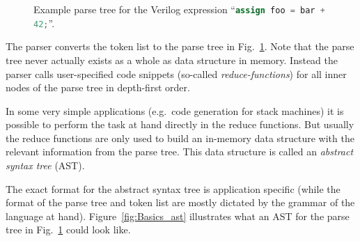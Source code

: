 \begin{figure}[b!]
	\hfil
	\caption{Example parse tree for the Verilog expression ``\lstinline[language=Verilog]{assign foo = bar + 42;}''.}
	\label{fig:Basics_parsetree}
\end{figure}

The parser converts the token list to the parse tree in Fig.~\ref{fig:Basics_parsetree}. Note that the parse
tree never actually exists as a whole as data structure in memory. Instead the parser calls user-specified
code snippets (so-called {\it reduce-functions}) for all inner nodes of the parse tree in depth-first order.

In some very simple applications (e.g.~code generation for stack machines) it is possible to perform the
task at hand directly in the reduce functions. But usually the reduce functions are only used to build an in-memory
data structure with the relevant information from the parse tree. This data structure is called an {\it abstract
syntax tree} (AST).

The exact format for the abstract syntax tree is application specific (while the format of the parse tree and token
list are mostly dictated by the grammar of the language at hand). Figure~\ref{fig:Basics_ast} illustrates what an
AST for the parse tree in Fig.~\ref{fig:Basics_parsetree} could look like.

